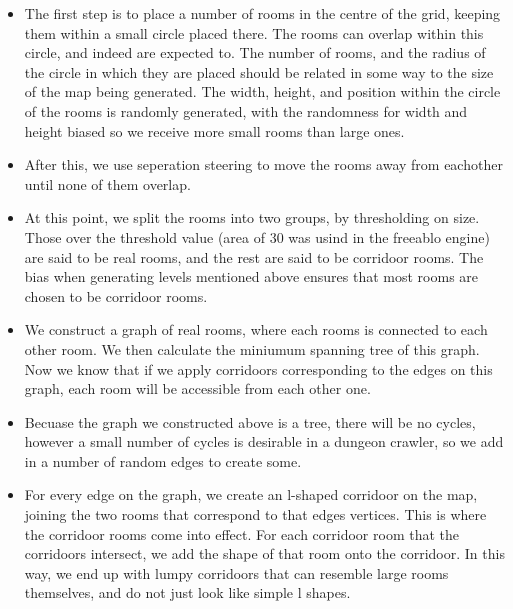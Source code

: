     \begin{itemize}
        \item
        {
            The first step is to place a number of rooms in the centre of the grid, keeping them within a small circle placed there.
            The rooms can overlap within this circle, and indeed are expected to. The number of rooms, and the radius of the circle in which they are placed
            should be related in some way to the size of the map being generated. The width, height, and position within the circle of the rooms is randomly generated, with the randomness for width and height biased so we receive more small rooms than large ones.    
        }
        \item
        {
            After this, we use seperation steering to move the rooms away from eachother until none of them overlap.
        }
        \item
        {
            At this point, we split the rooms into two groups, by thresholding on size. Those over the threshold value (area of 30 was usind in the freeablo engine) are said to be real rooms, and the rest are said to be corridoor rooms. The bias when generating levels mentioned above ensures that most rooms are chosen to be corridoor rooms.
        }
        \item
        {
            We construct a graph of real rooms, where each rooms is connected to each other room. We then calculate the miniumum spanning tree of this graph. Now we know that if we apply corridoors corresponding to the edges on this graph, each room will be accessible from each other one.
        }
        \item
        {
            Becuase the graph we constructed above is a tree, there will be no cycles, however a small number of cycles is desirable in a dungeon crawler, so we add in a number of random edges to create some.
        }
        \item
        {
            For every edge on the graph, we create an l-shaped corridoor on the map, joining the two rooms that correspond to that edges vertices.
            This is where the corridoor rooms come into effect. For each corridoor room that the corridoors intersect, we add the shape of that room onto the corridoor. In this way, we end up with lumpy corridoors that can resemble large rooms themselves, and do not just look like simple l shapes.
        }
    \end{itemize}
    
   	\newpage
    
